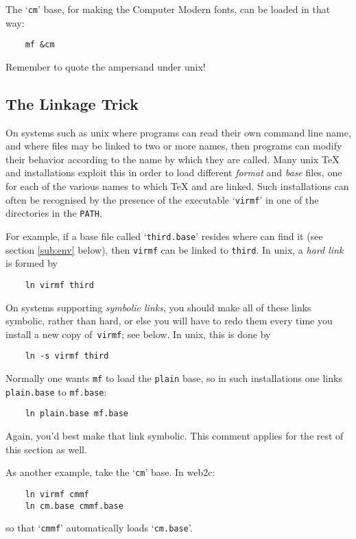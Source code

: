 The `{\tt cm}' base, for making the {\sc Computer Modern} fonts,
can be loaded in that way:
\begin{verbatim}
    mf &cm
\end{verbatim}
Remember to quote the ampersand under {\sc unix}!


\subsection{The Linkage Trick}\label{sub:link}

On systems such as {\sc unix} where programs can read their own
command line name, and where files may be linked to two or more
names, then programs can modify their behavior according to the
name by which they are called.  Many {\sc unix} \TeX{} and \MF{}
installations exploit this in order to load different {\em format\/}
and {\em base\/} files, one for each of the various names to which
\TeX{} and \MF{} are linked.  Such installations can often
be recognised by the presence of the executable `{\tt virmf}'
in one of the directories in the {\tt PATH}.

For example, if a base file called `{\tt third.base}' resides where
\MF{} can find it (see section \ref{sub:env} below), then
{\tt virmf} can be linked to {\tt third}.
In {\sc unix}, a {\em hard link\/} is formed by
\begin{verbatim}
    ln virmf third
\end{verbatim}

On systems supporting {\em symbolic links\/}, you should make all of
these links symbolic, rather than hard, or else you will have to redo
them every time you install a new copy of~{\tt virmf}; see below.
In {\sc unix}, this is done by
\begin{verbatim}
    ln -s virmf third
\end{verbatim}

Normally one wants {\tt mf} to load the {\tt plain} base,
so in such installations one links {\tt plain.base} to {\tt mf.base}:
\begin{verbatim}
    ln plain.base mf.base
\end{verbatim}
Again, you'd best make that link symbolic.  This comment applies for
the rest of this section as well.

As another example, take the `{\tt cm}' base.  In {\sf web2c}:
\begin{verbatim}
    ln virmf cmmf
    ln cm.base cmmf.base
\end{verbatim}
so that `{\tt cmmf}' automatically loads `{\tt cm.base}'.

